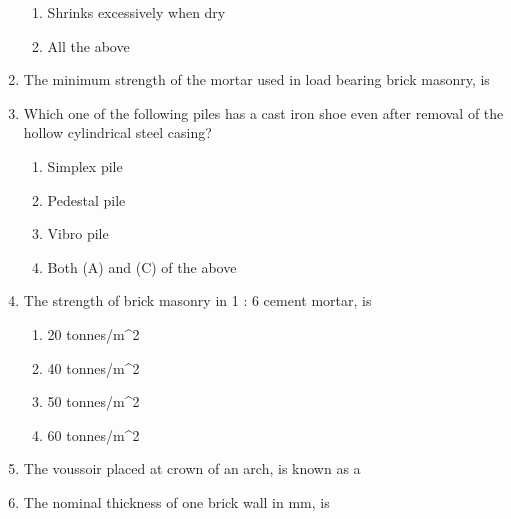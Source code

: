 \documentclass[11pt,a4paper]{article}
\begin{document}
\begin{enumerate}
\begin{enumerate}[label=\Alph*.]
\item{Shrinks excessively when dry}
\item{All the above}
\end{enumerate}
\item{The minimum strength of the mortar used in load bearing brick masonry, is}
\\
\item{Which one of the following piles has a cast iron shoe even after removal of the hollow cylindrical steel casing?}
\begin{enumerate}[label=\Alph*.]
\item{Simplex pile}
\item{Pedestal pile}
\item{Vibro pile}
\item{Both (A) and (C) of the above}
\end{enumerate}
\item{The strength of brick masonry in 1 : 6 cement mortar, is}
\begin{enumerate}[label=\Alph*.]
\item{20 tonnes/m\^{}2}
\item{40 tonnes/m\^{}2}
\item{50 tonnes/m\^{}2}
\item{60 tonnes/m\^{}2}
\end{enumerate}
\item{The voussoir placed at crown of an arch, is known as a}
\\
\item{The nominal thickness of one brick wall in mm, is}
\\\begin{enumerate*}[itemjoin=\qquad, label=\Alph*.]
\item{90 mm}
\item{150 mm}

\end{enumerate*}
\end{enumerate}
\end{document}

